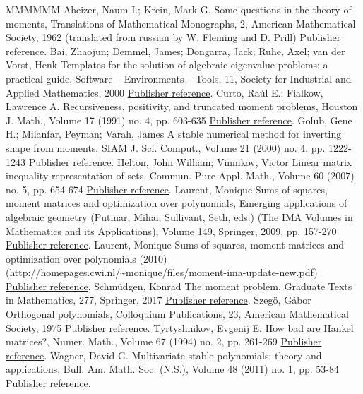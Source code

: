 \begin{thebibliography}{MMMMMM}
 Aheizer, Naum I.; Krein, Mark G. Some questions in the theory of moments, Translations of Mathematical Monographs, 2, American Mathematical Society, 1962 (translated from russian by W. Fleming and D. Prill) \href{https://ahl.centre-mersenne.org/item/AHL_2020__3__1327_0/#anheizer}{Publisher reference}.
 Bai, Zhaojun; Demmel, James; Dongarra, Jack; Ruhe, Axel; van der Vorst, Henk Templates for the solution of algebraic eigenvalue problems: a practical guide, Software – Environments – Tools, 11, Society for Industrial and Applied Mathematics, 2000 \href{https://ahl.centre-mersenne.org/item/AHL_2020__3__1327_0/#eig}{Publisher reference}.
 Curto, Raúl E.; Fialkow, Lawrence A. Recursiveness, positivity, and truncated moment problems, Houston J. Math., Volume 17 (1991) no. 4, pp. 603-635 \href{https://ahl.centre-mersenne.org/item/AHL_2020__3__1327_0/#curto}{Publisher reference}.
 Golub, Gene H.; Milanfar, Peyman; Varah, James A stable numerical method for inverting shape from moments, SIAM J. Sci. Comput., Volume 21 (2000) no. 4, pp. 1222-1243 \href{https://ahl.centre-mersenne.org/item/AHL_2020__3__1327_0/#golub}{Publisher reference}.
 Helton, John William; Vinnikov, Victor Linear matrix inequality representation of sets, Commun. Pure Appl. Math., Volume 60 (2007) no. 5, pp. 654-674 \href{https://ahl.centre-mersenne.org/item/AHL_2020__3__1327_0/#hv}{Publisher reference}.
 Laurent, Monique Sums of squares, moment matrices and optimization over polynomials, Emerging applications of algebraic geometry (Putinar, Mihai; Sullivant, Seth, eds.) (The IMA Volumes in Mathematics and its Applications), Volume 149, Springer, 2009, pp. 157-270 \href{https://ahl.centre-mersenne.org/item/AHL_2020__3__1327_0/#la1}{Publisher reference}.
 Laurent, Monique Sums of squares, moment matrices and optimization over polynomials (2010) (\url{http://homepages.cwi.nl/~monique/files/moment-ima-update-new.pdf}) \href{https://ahl.centre-mersenne.org/item/AHL_2020__3__1327_0/#la2}{Publisher reference}.
 Schmüdgen, Konrad The moment problem, Graduate Texts in Mathematics, 277, Springer, 2017 \href{https://ahl.centre-mersenne.org/item/AHL_2020__3__1327_0/#sch}{Publisher reference}.
 Szegö, Gábor Orthogonal polynomials, Colloquium Publications, 23, American Mathematical Society, 1975 \href{https://ahl.centre-mersenne.org/item/AHL_2020__3__1327_0/#sze}{Publisher reference}.
 Tyrtyshnikov, Evgenij E. How bad are Hankel matrices?, Numer. Math., Volume 67 (1994) no. 2, pp. 261-269 \href{https://ahl.centre-mersenne.org/item/AHL_2020__3__1327_0/#illhankel}{Publisher reference}.
 Wagner, David G. Multivariate stable polynomials: theory and applications, Bull. Am. Math. Soc. (N.S.), Volume 48 (2011) no. 1, pp. 53-84 \href{https://ahl.centre-mersenne.org/item/AHL_2020__3__1327_0/#wag}{Publisher reference}.
\end{thebibliography}
